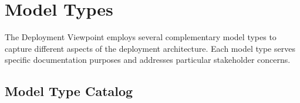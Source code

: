 \documentclass[11pt,letterpaper]{article}
\begin{document}
\section{Model Types}

The Deployment Viewpoint employs several complementary model types to capture different aspects of the deployment architecture. Each model type serves specific documentation purposes and addresses particular stakeholder concerns.

\subsection{Model Type Catalog}
\end{document}
